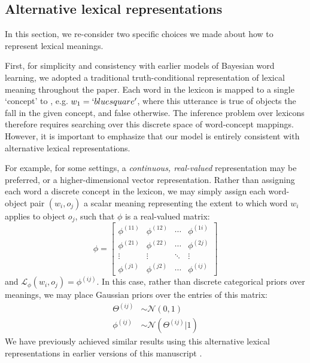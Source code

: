\documentclass[11pt, floatsintext]{apa6}
\begin{document}
\subsection{Alternative lexical representations}

In this section, we re-consider two specific choices we made about how to represent lexical meanings.

First, for simplicity and consistency with earlier models of Bayesian word learning, we adopted a traditional truth-conditional representation of lexical meaning throughout the paper. 
Each word in the lexicon is mapped to a single `concept' to , e.g. $w_1 = `blue square'$, where this utterance is true of objects the fall in the given concept, and false otherwise. 
The inference problem over lexicons therefore requires searching over this discrete space of word-concept mappings. 
However, it is important to emphasize that our model is entirely consistent with alternative lexical representations.

For example, for some settings, a \emph{continuous, real-valued} representation may be preferred, or a higher-dimensional vector representation.
Rather than assigning each word a discrete concept in the lexicon, we may simply assign each word-object pair $(w_i,o_j)$ a scalar meaning representing the extent to which word $w_i$ applies to object $o_j$, such that $\phi$ is a real-valued matrix:
$$
\phi = \begin{bmatrix}
\phi^{(11)} & \phi^{(12)} & \cdots & \phi^{(1i)} \\
\phi^{(21)} & \phi^{(22)} & \cdots & \phi^{(2j)} \\
\vdots & \vdots &\ddots & \vdots \\
\phi^{(j1)} & \phi^{(j2)} & \cdots & \phi^{(ij)} 
\end{bmatrix}
$$
and $\mathcal{L}_\phi(w_i, o_j) = \phi^{(ij)}$. 
In this case, rather than discrete categorical priors over meanings, we may place Gaussian priors over the entries of this matrix:
\begin{align}
\Theta^{(ij)} & \sim \mathcal{N}(0,1)\nonumber \\
\phi^{(ij)} & \sim \mathcal{N}(\Theta^{(ij)} | 1)\nonumber
\end{align}
We have previously achieved similar results using this alternative lexical representations in earlier versions of this manuscript \cite{hawkins_convention-formation_2017,hawkins2020generalizing}.
\end{document}
